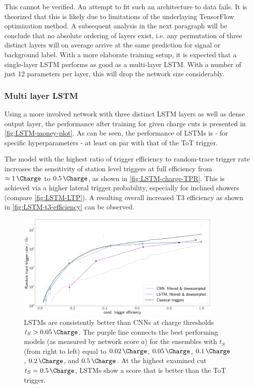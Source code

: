 This cannot be verified. An attempt to fit such an architecture to data fails. It is theorized that this is likely due to limitations of the underlaying TensorFlow 
optimization method. A subsequent analysis in the next paragraph will be conclude that no absolute ordering of layers exist, i.e. any permutation of three distinct
layers will on average arrive at the same prediction for signal or background label. With a more elaborate training setup, it is expected that a single-layer LSTM 
performs as good as a multi-layer LSTM. With a number of just 12 parameters per layer, this will drop the network size considerably.

\subsubsection{Multi layer LSTM}
\label{sssec:multi-layer-lsmt}

Using a more involved network with three distinct LSTM layers as well as dense output layer, the performance after training for given charge cuts is presented in
\autoref{fig:LSTM-money-plot}. As can be seen, the performance of LSTMs is - for specific hyperparameters - at least on par with that of the ToT trigger.

The model with the highest ratio of trigger efficiency to random-trace trigger rate increases the sensitivity of station level triggers at full efficiency from 
$\approx\SI{1}{\Charge}$ to $\SI{0.5}{\Charge}$, as shown in \autoref{fig:LSTM-charge-TPR}. This is achieved via a higher lateral trigger probability, especially
for inclined showers (compare \autoref{fig:LSTM-LTP}). A resulting overall increased T3 efficiency as shown in \autoref{fig:LSTM-t3-efficiency} can be observed.

\begin{figure}
	\centering
	\includegraphics[width=0.9\textwidth]{./plots/LSTM_money_plot.png}
	\caption{LSTMs are consistently better than CNNs at charge thresholds $t_S > \SI{0.05}{\Charge}$. The purple line connects the best performing models (as 
	measured by network score $a$) for the ensembles with $t_S$ (from right to left) equal to $\SI{0.02}{\Charge}$, $\SI{0.05}{\Charge}$, $\SI{0.1}{\Charge}$,
	$\SI{0.2}{\Charge}$, and $\SI{0.5}{\Charge}$. At the highest examined cut $t_S = \SI{0.5}{\Charge}$, LSTMs show a score that is better than the ToT trigger.}
	\label{fig:LSTM-money-plot}
\end{figure}

